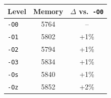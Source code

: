 \begin{tabular*}{\columnwidth}{@{\extracolsep\fill}lcc@{\extracolsep\fill}}
\toprule
\textbf{Level} & \textbf{Memory} & \textbf{$\Delta$ vs.\ \texttt{-O0}} \\
\midrule
\texttt{-O0} & 5764 & -- \\
\texttt{-O1} & 5802 & +1\% \\
\texttt{-O2} & 5794 & +1\% \\
\texttt{-O3} & 5834 & +1\% \\
\texttt{-Os} & 5840 & +1\% \\
\texttt{-Oz} & 5852 & +2\% \\
\bottomrule
\end{tabular*}
